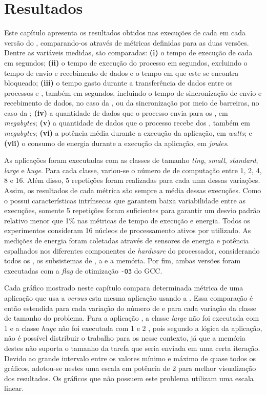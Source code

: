 \chapter{Resultados}
\label{ch:resultados}

Este capítulo apresenta os resultados obtidos nas execuções de cada  em cada versão do \capb, comparando-os através de métricas definidas para as duas versões. Dentre as variáveis medidas, são comparadas: \textbf{(i)} o tempo de execução de cada \CC em segundos; \textbf{(ii)} o tempo de execução do processo \master em segundos, excluindo o tempo de envio e recebimento de dados e o tempo em que este se encontra bloqueado; \textbf{(iii)} o tempo gasto durante a transferência de dados entre os processos \master e \slave, também em segundos, incluindo o tempo de sincronização de envio e recebimento de dados, no caso da \IPC, ou da sincronização por meio de barreiras, no caso da \ASYNC; \textbf{(iv)} a quantidade de dados que o processo \master envia para os \slaves, em \textit{megabytes}; \textbf{(v)} a quantidade de dados que o processo \master recebe dos \slaves, também em \textit{megabytes}; \textbf{(vi)} a potência média durante a execução da aplicação, em \textit{watts}; e \textbf{(vii)} o consumo de energia durante a execução da aplicação, em \textit{joules}.

As aplicações foram executadas com as classes de tamanho \textit{tiny}, \textit{small}, \textit{standard}, \textit{large} e \textit{huge}. Para cada classe, variou-se o número de \clusters de computação entre 1, 2, 4, 8 e 16. Além disso, 5 repetições foram realizadas para cada uma dessas variações. Assim, os resultados de cada métrica são sempre a média dessas execuções. Como o \mppa possui características intrínsecas que garantem baixa variabilidade entre as execuções, somente 5 repetições foram suficientes para garantir um desvio padrão relativo menor que 1\% nas métricas de tempo de execução e energia. Todos os experimentos consideram 16 núcleos de processamento ativos por \cluster utilizado. As medições de energia foram coletadas através de sensores de energia e potência espalhados nos diferentes componentes de \textit{hardware} do processador, considerando todos os \clusters, os subsistemas de \IO, a \NoC e a memória. Por fim, ambas versões foram executadas com a \textit{flag} de otimização \texttt{-O3} do GCC.

Cada gráfico mostrado neste capítulo compara determinada métrica de uma aplicação que usa a \API \ASYNC \textit{versus} esta mesma aplicação usando a \API \IPC. Essa comparação é então estendida para cada variação do número de \clusters e para cada variação da classe de tamanho do problema. Para a aplicação \KM, a classe \textit{large} não foi executada com 1 \cluster e a classe \textit{huge} não foi executada com 1 e 2 \clusters, pois segundo a lógica da aplicação, não é possível distribuir o trabalho para os \clusters nesse contexto, já que a memória destes não suporta o tamanho da tarefa que seria enviada em uma certa iteração. Devido ao grande intervalo entre os valores mínimo e máximo de quase todos os gráficos, adotou-se nestes uma escala em potência de 2 para melhor visualização dos resultados. Os gráficos que não possuem este problema utilizam uma escala linear.

